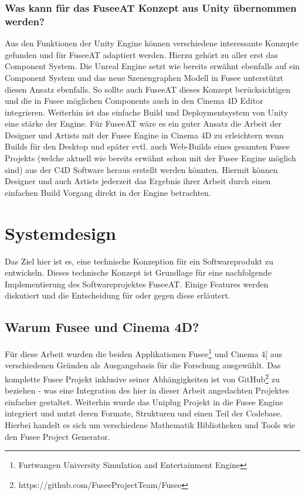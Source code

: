 \documentclass[pagesize, paper=a4, fontsize=12pt, titlepage=true, headings=small, headnosepline, abstractoff, liststotoc, nochapterprefix, plainheadsepline, twoside]{scrreprt}
\newcommand{\CSS}{C\texttt{\# }}
\begin{document}
\subsubsection{Was kann für das FuseeAT Konzept aus Unity übernommen werden?}
Aus den Funktionen der Unity Engine können verschiedene interessante Konzepte gefunden und für FuseeAT adaptiert werden. Hierzu gehört zu aller erst das Component System. Die Unreal Engine setzt wie bereits erwähnt ebenfalls auf ein Component System und das neue Szenengraphen Modell in Fusee unterstützt diesen Ansatz ebenfalls. So sollte auch FuseeAT dieses Konzept berücksichtigen und die in Fusee möglichen Components auch in den Cinema 4D Editor integrieren. Weiterhin ist das einfache Build und Deploymentsystem von Unity eine stärke der Engine. Für FuseeAT wäre es ein guter Ansatz die Arbeit der Designer und Artists mit der Fusee Engine in Cinema 4D zu erleichtern wenn Builds für den Desktop und später evtl. auch Web-Builds eines gesamten Fusee Projekts (welche aktuell wie bereits erwähnt schon mit der Fusee Engine möglich sind) aus der C4D Software heraus erstellt werden könnten. Hiermit können  Designer und auch Artists jederzeit das Ergebnis ihrer Arbeit durch einen einfachen Build Vorgang direkt in der Engine betrachten.


\section{Systemdesign}
Das Ziel hier ist es, eine technische Konzeption für ein Softwareprodukt zu entwickeln. Dieses technische Konzept ist Grundlage für eine nachfolgende Implementierung des Softwareprojektes FuseeAT. Einige Features werden diskutiert und die Entscheidung für oder gegen diese erläutert.

\subsection{Warum Fusee und Cinema 4D?}
Für diese Arbeit wurden die beiden Applikationen Fusee\footnote{Furtwangen University Simulation and Entertainment Engine} und Cinema 4[\autocite{MaxonC4d2014} aus verschiedenen Gründen als Ausgangsbasis für die Forschung ausgewählt. Das komplette Fusee Projekt inklusive seiner Abhängigkeiten ist von GitHub\footnote{https://github.com/FuseeProjectTeam/Fusee} zu beziehen - was eine Integration des hier in dieser Arbeit angedachten Projektes einfacher gestaltet. Weiterhin wurde das Uniplug Projekt in die Fusee Engine integriert und nutzt deren Formate, Strukturen und einen Teil der Codebase. Hierbei handelt es sich um verschiedene Mathematik Bibliotheken und Tools wie den Fusee Project Generator.
\end{document}
